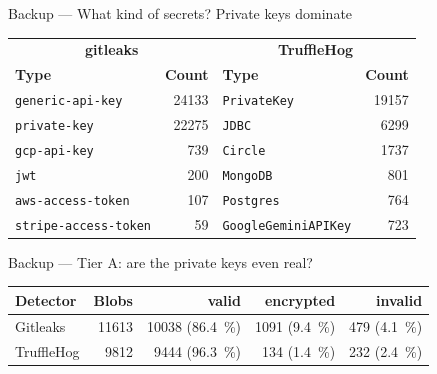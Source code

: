 \documentclass[aspectratio=169]{beamer}
\newcommand{\SecretPKValidBlobs}{\num{10038}\xspace}
\newcommand{\SecretPKFlaggedBlobs}{\num{11613}\xspace}
\newcommand{\SecretPKValidPct}{\SI{86.4}{\percent}\xspace}
\begin{document}
\begin{frame}{Backup --- What kind of secrets? Private keys dominate}
    \begin{center}
    \begin{tabular}{lr@{\hskip 1.2cm}lr}
        \toprule
        \multicolumn{2}{c}{\textbf{gitleaks}} & \multicolumn{2}{c}{\textbf{TruffleHog}} \\
        \textbf{Type} & \textbf{Count} & \textbf{Type} & \textbf{Count} \\
        \midrule
        \texttt{generic-api-key}     & \num{24133} & \texttt{PrivateKey}         & \num{19157} \\
        \texttt{private-key}         & \num{22275} & \texttt{JDBC}               & \num{6299}  \\
        \texttt{gcp-api-key}         & \num{739}   & \texttt{Circle}             & \num{1737}  \\
        \texttt{jwt}                 & \num{200}   & \texttt{MongoDB}            & \num{801}   \\
        \texttt{aws-access-token}    & \num{107}   & \texttt{Postgres}           & \num{764}   \\
        \texttt{stripe-access-token} & \num{59}    & \texttt{GoogleGeminiAPIKey} & \num{723}   \\
        \bottomrule
    \end{tabular}
    \end{center}
\end{frame}

\begin{frame}{Backup --- Tier A: are the private keys even real?}
    \centering
    \begin{tabular}{lrrrr}
        \toprule
        \textbf{Detector} & \textbf{Blobs} & \textbf{valid} & \textbf{encrypted} & \textbf{invalid} \\
        \midrule
        Gitleaks   & \num{11613} & \num{10038} (\SI{86.4}{\percent}) & \num{1091} (\SI{9.4}{\percent}) & \num{479} (\SI{4.1}{\percent}) \\
        TruffleHog & \num{9812}  & \num{9444} (\SI{96.3}{\percent})  & \num{134} (\SI{1.4}{\percent})  & \num{232} (\SI{2.4}{\percent}) \\
        \bottomrule
    \end{tabular}
\end{frame}
\end{document}
